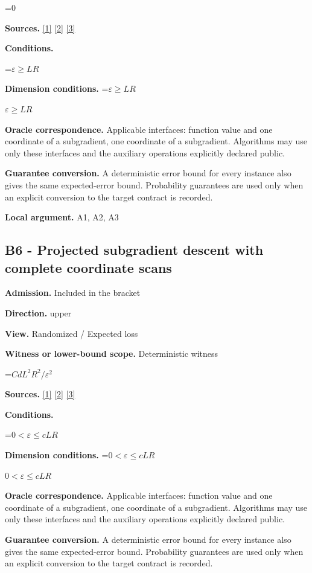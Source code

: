 \documentclass[10pt,a4paper]{article}
\newcommand{\AtlasMath}[1]{\par\begingroup\centering\setbox0=\hbox{$\displaystyle #1$}\ifdim\wd0>1.4\linewidth\typeout{ATLAS WIDE FORMULA: \the\wd0}\fi\ifdim\wd0>\linewidth\resizebox{\linewidth}{!}{\box0}\else\box0\fi\par\endgroup}
\newcommand{\AtlasInlineMath}[1]{\begingroup\setbox0=\hbox{$#1$}\ifdim\wd0>.4\linewidth\endgroup\AtlasMath{#1}\else\endgroup$#1$\fi}
\begin{document}
\AtlasMath{0}
\textbf{Sources.} \href{https://arxiv.org/pdf/1405.4980}{[1]} \href{https://www2.isye.gatech.edu/~nemirovs/MOR_AccuracyCertificates.pdf}{[2]} \href{https://arxiv.org/pdf/2609.20701}{[3]}

\textbf{Conditions.} 
\AtlasMath{\varepsilon\ge LR}


\textbf{Dimension conditions.} \AtlasInlineMath{\varepsilon\ge LR}

\textbf{Oracle correspondence.} Applicable interfaces: function value and one coordinate of a subgradient, one coordinate of a subgradient. Algorithms may use only these interfaces and the auxiliary operations explicitly declared public.

\textbf{Guarantee conversion.} A deterministic error bound for every instance also gives the same expected-error bound. Probability guarantees are used only when an explicit conversion to the target contract is recorded.

\textbf{Local argument.} A1, A2, A3

\subsection{B6 - Projected subgradient descent with complete coordinate scans}
\textbf{Admission.} Included in the bracket

\textbf{Direction.} upper

\textbf{View.} Randomized / Expected loss

\textbf{Witness or lower-bound scope.} Deterministic witness

\AtlasMath{CdL^2R^2/\varepsilon^2}
\textbf{Sources.} \href{https://arxiv.org/pdf/1405.4980}{[1]} \href{https://www2.isye.gatech.edu/~nemirovs/MOR_AccuracyCertificates.pdf}{[2]} \href{https://arxiv.org/pdf/2609.20701}{[3]}

\textbf{Conditions.} 
\AtlasMath{0<\varepsilon\le cLR}


\textbf{Dimension conditions.} \AtlasInlineMath{0<\varepsilon\le cLR}

\textbf{Oracle correspondence.} Applicable interfaces: function value and one coordinate of a subgradient, one coordinate of a subgradient. Algorithms may use only these interfaces and the auxiliary operations explicitly declared public.

\textbf{Guarantee conversion.} A deterministic error bound for every instance also gives the same expected-error bound. Probability guarantees are used only when an explicit conversion to the target contract is recorded.
\end{document}
